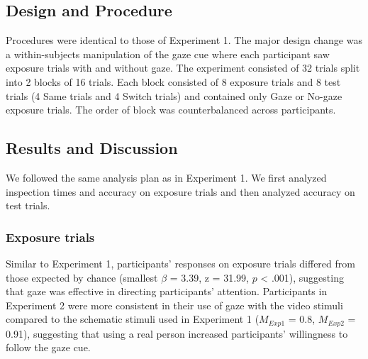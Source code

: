 \documentclass[oneside]{report}
\begin{document}
\hypertarget{design-and-procedure-1}{%
\subsection{Design and Procedure}\label{design-and-procedure-1}}

Procedures were identical to those of Experiment 1. The major design
change was a within-subjects manipulation of the gaze cue where each
participant saw exposure trials with and without gaze. The experiment
consisted of 32 trials split into 2 blocks of 16 trials. Each block
consisted of 8 exposure trials and 8 test trials (4 Same trials and 4
Switch trials) and contained only Gaze or No-gaze exposure trials. The
order of block was counterbalanced across participants.

\hypertarget{results-and-discussion-1}{%
\subsection{Results and Discussion}\label{results-and-discussion-1}}

We followed the same analysis plan as in Experiment 1. We first analyzed
inspection times and accuracy on exposure trials and then analyzed
accuracy on test trials.

\hypertarget{exposure-trials-1}{%
\subsubsection{Exposure trials}\label{exposure-trials-1}}

Similar to Experiment 1, participants' responses on exposure trials
differed from those expected by chance (smallest \(\beta\) = 3.39, z =
31.99, \(p\) \textless{} .001), suggesting that gaze was effective in
directing participants' attention. Participants in Experiment 2 were
more consistent in their use of gaze with the video stimuli compared to
the schematic stimuli used in Experiment 1 (\(M_{Exp1}\) = 0.8,
\(M_{Exp2}\) = 0.91), suggesting that using a real person increased
participants' willingness to follow the gaze cue.
\end{document}
